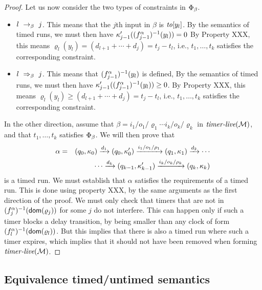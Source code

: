\begin{proof}
 Let us now consider the two types of constraints in $\Phi_{\beta}$.
 \begin{itemize}
 \item $l \ \rightarrow_{\beta} \  j$. This means that the $j$th input in $\beta$ is
   $\mathit{to}[y_l]$. By the semantics of timed runs, we must then have
   $\kappa_{j-1}'((f_{j-1}^{\alpha})^{-1}(y_l)) = 0$ By Property XXX, this means
   $\varrho_l(y_l) = (d_{l+1} + \cdots + d_j) = t_j - t_l$, i.e.,
   $t_1, \ldots, t_k$ satisfies the corresponding constraint.
 \item $l \ \Rightarrow_{\beta}\  j$. This means that $(f_{j-1}^{\alpha})^{-1}(y_l)$
   is defined, 
   By the semantics of timed runs, we must then have
   $\kappa_{j-1}'((f_{j-1}^{\alpha})^{-1}(y_l)) \geq 0$.
   By Property XXX, this means
   $\varrho_l(y_l) \geq (d_{l+1} + \cdots + d_j) = t_j - t_l$, i.e.,
   $t_1, \ldots, t_k$ satisfies the corresponding constraint.
 \end{itemize}
In the other direction, assume that 
 $\beta = {i_1/o_1/\varrho_1}  \cdots {i_k/o_k/\varrho_k}$
   in $\mbox{\it timer-live}({{\mathcal M}})$,
and that
$t_1, \ldots, t_k$ satisfies $\Phi_{\beta}$.
We will then prove that
\begin{eqnarray*}
\alpha & = & (q_0,\kappa_0) \xrightarrow{d_1} (q_0,\kappa_0') \xrightarrow{i_1/o_1/\rho_1} (q_1,\kappa_1) \xrightarrow{d_2} 
\cdots
\\ && \qquad \cdots
\xrightarrow{d_k} (q_{k-1},\kappa_{k-1}') \xrightarrow{i_k/o_k/\rho_k} (q_k,\kappa_k)
\end{eqnarray*}
is a timed run. We must establish that $\alpha$
satisfies the requirements of a timed run. This is done
using property XXX, by the same arguments
as the first direction of the proof. We must only check that timers that
are not in $(f_{j}^{\alpha})^{-1}({\textsf{dom}}(\varrho_j))$ for some $j$ do not
interfere. This can happen only if such a timer blocks a delay transition,
by being smaller than any clock of form
$(f_{l}^{\alpha})^{-1}({\textsf{dom}}(\varrho_l))$.
But this implies that there is also a timed run where such a timer expires,
which implies that it should not have been removed when forming
$\mbox{\it timer-live}({{\mathcal M}})$.
\end{proof}

\subsection{Equivalence timed/untimed semantics}
\label{sec:bj-wiggling}

